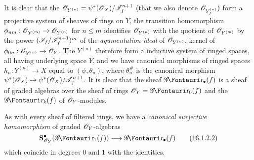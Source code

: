It is clear that the $\mathscr{O}_{Y^{(n)}} = \psi^*(\mathscr{O}_X)/\mathscr{I}_f^{n+1}$ (that we also denote $\mathscr{O}_{Y_f^{(n)}})$ form a
projective system of sheaves of rings on $Y$, the transition homomorphism $\vphi_{nm}:\sh{O}_{Y^{(m)}} \to \sh{O}_{Y^{(n)}}$ for $n \leq m$ identifies $\mathscr{O}_{Y^{(n)}}$ with the quotient of $\mathscr{O}_{Y^{(m)}}$ by the power $(\mathscr{I}_f/\mathscr{I}_f^{n+1} )^m$ of the \emph{agumentation ideal} of $\mathscr{O}_{Y^{(n)}}$, kernel of $\vphi_{0n}: \sh{O}_{Y^{(n)}} \to \sh{O}_{Y}$.
The $Y^{(n)}$ therefore form a inductive system of ringed spaces, all having underlying space $Y$, and we have canonical morphisms of ringed spaces $h_n: Y^{(n)} \to X$ equal to $(\psi, \theta_n)$, where $\theta^\#_n$ is the canonical morphism $\psi^*(\sh{O}_X) \to \psi^*(\sh{O}_X)/\sh{I}_f^{n+1}$.
It is clear that the sheaf $\shGr_\bullet(f)$ is a sheaf of graded algebras over the sheaf of rings $\sh{O}_Y = \shGr_0(f)$ and the $\shGr_k(f)$ of $\mathscr{O}_Y$-modules.

As with every sheaf of filtered rings, we have a \emph{canonical surjective homomorphism} of graded $\mathscr{O}_Y$-algebras
\[
  \label{IV.16.1.2.2}
  \bb{S}_{\sh{O}_Y}^\bullet(\shGr_1(f)) \to \shGr_\bullet(f)
  \tag{16.1.2.2}
\]
which coincide in degrees $0$ and $1$ with the identities.

